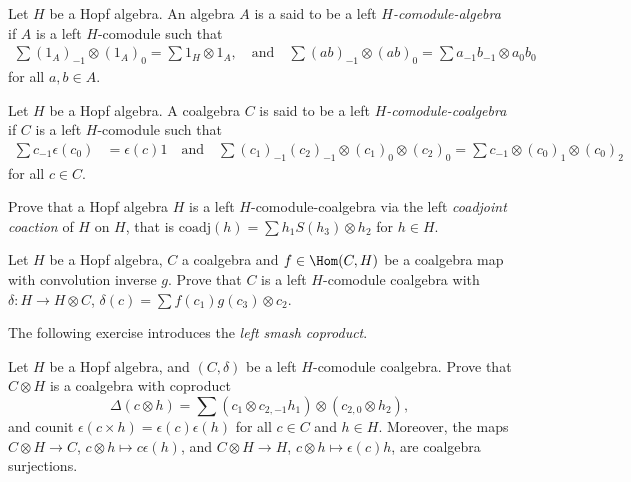 \documentclass[12pt]{amsproc}
\begin{document}
\begin{definition}
Let $H$ be a Hopf algebra. An algebra $A$ is a said to be a left
\emph{$H$-comodule-algebra} if $A$ is a left $H$-comodule such that 
\begin{align*}
\sum (1_A)_{-1}\otimes (1_A)_0 =\sum 1_{H}\otimes1_{A},
\quad\text{and}\quad 
\sum (ab)_{-1}\otimes (ab)_0 =\sum a_{-1}b_{-1}\otimes a_{0}b_{0}
\end{align*}
for all $a,b\in A$. 
\end{definition}


\begin{definition}
Let $H$ be a Hopf algebra. A coalgebra $C$ is said to be a left
\emph{$H$-comodule-coalgebra} if $C$ 
is a left $H$-comodule such that 
\begin{align*}
\sum c_{-1}\epsilon(c_{0}) & =\epsilon(c)1
\quad\text{and}\quad 
\sum (c_{1})_{-1}(c_{2})_{-1}\otimes(c_{1})_{0}\otimes(c_{2})_{0}  =\sum c_{-1}\otimes(c_{0})_{1}\otimes(c_{0})_{2}
\end{align*}
for all $c\in C$.
\end{definition}

\begin{exercise}
Prove that a Hopf algebra 
$H$ is a left $H$-comodule-coalgebra via the left \emph{coadjoint coaction}
of $H$ on $H$, that is $\mathrm{coadj}(h)=\sum h_{1}S(h_{3})\otimes h_{2}$ for $h\in H$. 
\end{exercise}

\begin{exercise}
Let $H$ be a Hopf algebra, $C$ a coalgebra and $f\in\Hom(C,H)$
be a coalgebra map with convolution inverse $g$. Prove that $C$ 
is a left $H$-comodule coalgebra with
$\delta\colon H\to H\otimes C$, 
$\delta(c)=\sum f(c_{1})g(c_{3})\otimes c_{2}$. 
\end{exercise}

The following exercise introduces the 
\emph{left smash coproduct}.

\begin{exercise}
\label{xca:smash_coleft}
Let $H$ be a Hopf algebra, and $(C,\delta)$ be a left $H$-comodule
coalgebra. Prove that $C\otimes H$ is a coalgebra with coproduct
\[
\Delta(c\otimes h)=\sum \left(c_{1}\otimes c_{2,-1}h_{1}\right)\otimes\left(c_{2,0}\otimes h_{2}\right),
\]
and counit $\epsilon(c\times h)=\epsilon(c)\epsilon(h)$ for
all $c\in C$ and $h\in H$.  Moreover, the maps $C\otimes H\to C$,
$c\otimes h\mapsto c\epsilon(h)$, and $C\otimes H\to H$, $c\otimes h\mapsto
\epsilon(c)h$, are coalgebra surjections.
\end{exercise}
\end{document}
